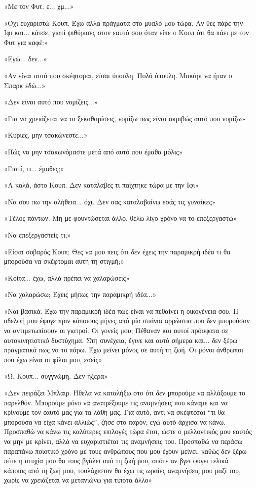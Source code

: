 \documentclass[12pt,twoside, openany]{book}
\begin{document}
«Με τον Φυτ, ε... χμ...»

«Όχι ευχαριστώ Κουπ. Έχω άλλα πράγματα στο μυαλό μου τώρα. Αν θες πάρε την Ιφι και... κάτσε, γιατί ψιθύρισες στον εαυτό σου όταν είπε ο Κουπ ότι θα πάει με τον Φυτ για καφέ;»

«Εγώ... δεν...»

«Αν είναι αυτό που σκέφτομαι, είσαι ύπουλη. Πολύ ύπουλη. Μακάρι να ήταν ο Σπαρκ εδώ...»

«Δεν είναι αυτό που νομίζεις...»

«Για να χρειάζεται να το ξεκαθαρίσεις, νομίζω πως είναι ακριβώς αυτό που νομίζω»

«Κυρίες, μην τσακώνεστε...»

«Πώς να μην τσακωνόμαστε μετά από αυτό που έμαθα μόλις»

«Γιατί, τι... έμαθες;»

«Α καλά, άστο Κουπ. Δεν κατάλαβες τι παίχτηκε τώρα με την Ιφι»

«Να σου πω την αλήθεια... όχι. Δεν σας καταλαβαίνω εσάς τις γυναίκες»

«Τέλος πάντων. Μη με φουντώσεται άλλο, θέλω λίγο χρόνο να το επεξεργαστώ»

«Να επεξεργαστείς τι;»

«Είσαι σοβαρός Κουπ; Θες να μου πεις ότι δεν έχεις την παραμικρή ιδέα τι θα μπορούσα να σκέφτομαι αυτή τη στιγμή;»

«Κοίτα... έχω, αλλά πρέπει να χαλαρώσεις»

«Να χαλαρώσω; Έχεις μήπως την παραμικρή ιδέα...»

«Ναι βασικά. Έχω την παραμικρή ιδέα πως είναι να πεθαίνει η οικογένεια σου. Η αδελφή μου έφυγε πριν κάποιους μήνες από μία σπάνια αρρώστια που δεν μπορούσαν να αντιμετωπίσουν οι γιατροί. Οι γονείς μου; Πέθαναν και αυτοί πρόσφατα σε αυτοκινητιστικό δυστύχημα. Στη συνέχεια, έγινε και αυτό σήμερα και... δεν ξέρω πραγματικά πως να το πάρω. Έχω μείνει μόνος σε αυτή τη ζωή. Οι μόνοι άνθρωποι που έχω είναι οι φίλοι μου, εσείς»

«Ω, Κουπ... συγγνώμη. Δεν ήξερα»

«Δεν πειράζει Μπλαιρ. Ήθελα να καταλήξω στο ότι δεν μπορούμε να αλλάξουμε το παρελθόν. Μπορούμε μόνο να ανατρέξουμε τις αναμνήσεις που κάναμε και να κρίνουμε τον εαυτό μας για τα λάθη μας. Για αυτό, αντί να σκέφτεσαι “τι θα μπορούσα να είχα κάνει αλλιώς”, ζήσε στο παρόν, εγώ αυτό άρχισα να κάνω. Προσπαθώ να κάνω τις καλύτερες επιλογές τώρα έτσι, ώστε ο μελλοντικός μου εαυτός να μην με κρίνει, αλλά να ευχαριστιέται τις αναμνήσεις του. Προσπαθώ να περάσω παραπάνω ποιοτικό χρόνο με τους ανθρώπους που μου έχουν μείνει, καθώς δεν ξέρω πότε η ατυχία μου θα τους βγάλει από τη ζωή μου, οπότε αν βγει φύγει τελικά κάποιος από τη ζωή μου, τουλάχιστον θα έχω τις ωραίες αναμνήσεις μου μαζί του, χωρίς να χρειάζεται να μετανιώνω για τίποτα άλλο»
\end{document}
